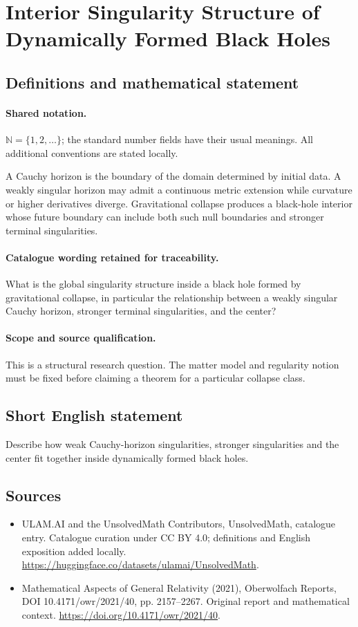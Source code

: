 \documentclass[11pt]{article}
\begin{document}
\section{Interior Singularity Structure of Dynamically Formed Black Holes}\label{statement}

\subsection{Definitions and mathematical statement}

\paragraph{Shared notation.}$\mathbb N=\{1,2,\ldots\}$; the standard number fields have their usual meanings. All additional conventions are stated locally.


A Cauchy horizon is the boundary of the domain determined by initial data. A weakly singular horizon may admit a continuous metric extension while curvature or higher derivatives diverge. Gravitational collapse produces a black-hole interior whose future boundary can include both such null boundaries and stronger terminal singularities.

\paragraph{Catalogue wording retained for traceability.}
What is the global singularity structure inside a black hole formed by gravitational collapse, in particular the relationship between a weakly singular Cauchy horizon, stronger terminal singularities, and the center?

\paragraph{Scope and source qualification.}This is a structural research question. The matter model and regularity notion must be fixed before claiming a theorem for a particular collapse class.
\subsection{Short English statement}
Describe how weak Cauchy-horizon singularities, stronger singularities and the center fit together inside dynamically formed black holes.
\subsection{Sources}
\begin{itemize}
\item[\hypertarget{source:statement:1}{S1}] ULAM.AI and the UnsolvedMath Contributors, UnsolvedMath, catalogue entry. Catalogue curation under CC BY 4.0; definitions and English exposition added locally.
\url{https://huggingface.co/datasets/ulamai/UnsolvedMath}.
\item[\hypertarget{source:statement:2}{S2}] Mathematical Aspects of General Relativity (2021), Oberwolfach Reports, DOI 10.4171/owr/2021/40, pp. 2157--2267. Original report and mathematical context.
\url{https://doi.org/10.4171/owr/2021/40}.
\end{itemize}
\label{end:statement}
\end{document}
